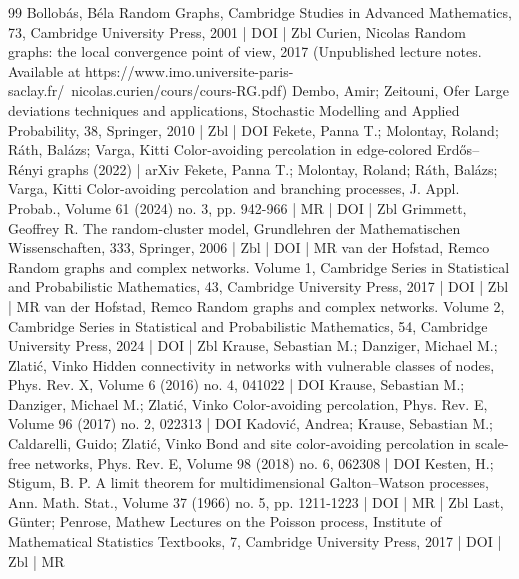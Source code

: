 \begin{thebibliography}{99}
 Bollobás, Béla Random Graphs, Cambridge Studies in Advanced Mathematics, 73, Cambridge University Press, 2001 | DOI | Zbl
 Curien, Nicolas Random graphs: the local convergence point of view, 2017 (Unpublished lecture notes. Available at https://www.imo.universite-paris-saclay.fr/~nicolas.curien/cours/cours-RG.pdf)
 Dembo, Amir; Zeitouni, Ofer Large deviations techniques and applications, Stochastic Modelling and Applied Probability, 38, Springer, 2010 | Zbl | DOI
 Fekete, Panna T.; Molontay, Roland; Ráth, Balázs; Varga, Kitti Color-avoiding percolation in edge-colored Erdős–Rényi graphs (2022) | arXiv
 Fekete, Panna T.; Molontay, Roland; Ráth, Balázs; Varga, Kitti Color-avoiding percolation and branching processes, J. Appl. Probab., Volume 61 (2024) no. 3, pp. 942-966 | MR | DOI | Zbl
 Grimmett, Geoffrey R. The random-cluster model, Grundlehren der Mathematischen Wissenschaften, 333, Springer, 2006 | Zbl | DOI | MR
 van der Hofstad, Remco Random graphs and complex networks. Volume 1, Cambridge Series in Statistical and Probabilistic Mathematics, 43, Cambridge University Press, 2017 | DOI | Zbl | MR
 van der Hofstad, Remco Random graphs and complex networks. Volume 2, Cambridge Series in Statistical and Probabilistic Mathematics, 54, Cambridge University Press, 2024 | DOI | Zbl
 Krause, Sebastian M.; Danziger, Michael M.; Zlatić, Vinko Hidden connectivity in networks with vulnerable classes of nodes, Phys. Rev. X, Volume 6 (2016) no. 4, 041022 | DOI
 Krause, Sebastian M.; Danziger, Michael M.; Zlatić, Vinko Color-avoiding percolation, Phys. Rev. E, Volume 96 (2017) no. 2, 022313 | DOI
 Kadović, Andrea; Krause, Sebastian M.; Caldarelli, Guido; Zlatić, Vinko Bond and site color-avoiding percolation in scale-free networks, Phys. Rev. E, Volume 98 (2018) no. 6, 062308 | DOI
 Kesten, H.; Stigum, B. P. A limit theorem for multidimensional Galton–Watson processes, Ann. Math. Stat., Volume 37 (1966) no. 5, pp. 1211-1223 | DOI | MR | Zbl
 Last, Günter; Penrose, Mathew Lectures on the Poisson process, Institute of Mathematical Statistics Textbooks, 7, Cambridge University Press, 2017 | DOI | Zbl | MR
\end{thebibliography}

